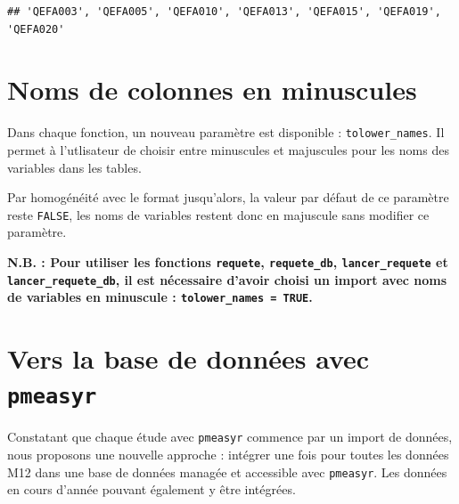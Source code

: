 \documentclass[]{book}
\newenvironment{Shaded}{\begin{snugshade}}{\end{snugshade}}
\newcommand{\CharTok}[1]{\textcolor[rgb]{0.31,0.60,0.02}{#1}}
\newcommand{\DataTypeTok}[1]{\textcolor[rgb]{0.13,0.29,0.53}{#1}}
\newcommand{\KeywordTok}[1]{\textcolor[rgb]{0.13,0.29,0.53}{\textbf{#1}}}
\newcommand{\NormalTok}[1]{#1}
\newcommand{\OperatorTok}[1]{\textcolor[rgb]{0.81,0.36,0.00}{\textbf{#1}}}
\newcommand{\StringTok}[1]{\textcolor[rgb]{0.31,0.60,0.02}{#1}}
\begin{document}
\begin{Shaded}
\end{Shaded}

\begin{verbatim}
## 'QEFA003', 'QEFA005', 'QEFA010', 'QEFA013', 'QEFA015', 'QEFA019', 'QEFA020'
\end{verbatim}

\hypertarget{noms-de-colonnes-en-minuscules}{%
\chapter{Noms de colonnes en minuscules}\label{noms-de-colonnes-en-minuscules}}

Dans chaque fonction, un nouveau paramètre est disponible : \texttt{tolower\_names}. Il permet à l'utlisateur de choisir entre minuscules et majuscules pour les noms des variables dans les tables.

Par homogénéité avec le format jusqu'alors, la valeur par défaut de ce paramètre reste \texttt{FALSE}, les noms de variables restent donc en majuscule sans modifier ce paramètre.

\textbf{N.B. : Pour utiliser les fonctions \texttt{requete}, \texttt{requete\_db}, \texttt{lancer\_requete} et \texttt{lancer\_requete\_db}, il est nécessaire d'avoir choisi un import avec noms de variables en minuscule : \texttt{tolower\_names\ =\ TRUE}.}

\hypertarget{vers-la-base-de-donnees-avec-pmeasyr}{%
\chapter{\texorpdfstring{Vers la base de données avec \texttt{pmeasyr}}{Vers la base de données avec pmeasyr}}\label{vers-la-base-de-donnees-avec-pmeasyr}}

Constatant que chaque étude avec \texttt{pmeasyr} commence par un import de données, nous proposons une nouvelle approche : intégrer une fois pour toutes les données M12 dans une base de données managée et accessible avec \texttt{pmeasyr}. Les données en cours d'année pouvant également y être intégrées.
\end{document}
